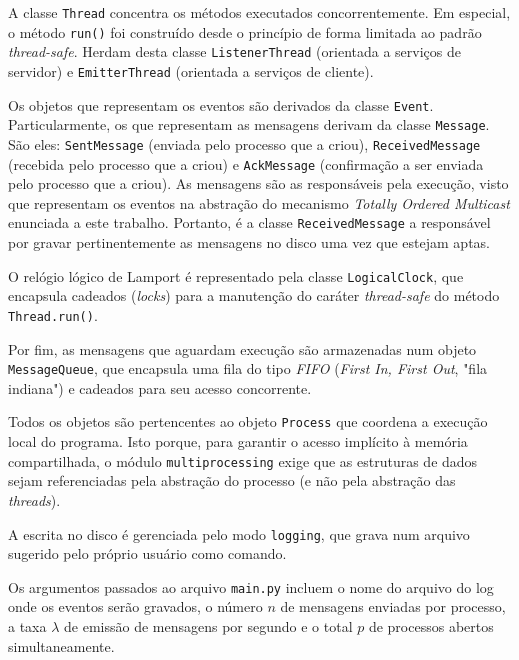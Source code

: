\documentclass[a4paper,12pt]{article}
\begin{document}
        A classe \texttt{Thread} concentra os métodos executados concorrentemente.
        Em especial, o método \texttt{run()} foi construído desde o princípio de forma limitada ao padrão \emph{thread-safe}.
        Herdam desta classe \texttt{ListenerThread} (orientada a serviços de servidor) e \texttt{EmitterThread} (orientada a serviços de cliente).

        Os objetos que representam os eventos são derivados da classe \texttt{Event}.
        Particularmente, os que representam as mensagens derivam da classe \texttt{Message}.
        São eles: \texttt{SentMessage} (enviada pelo processo que a criou), \texttt{ReceivedMessage} (recebida pelo processo que a criou) e \texttt{AckMessage} (confirmação a ser enviada pelo processo que a criou).
        As mensagens são as responsáveis pela execução, visto que representam os eventos na abstração do mecanismo \emph{Totally Ordered Multicast} enunciada a este trabalho.
        Portanto, é a classe \texttt{ReceivedMessage} a responsável por gravar pertinentemente as mensagens no disco uma vez que estejam aptas.

        O relógio lógico de Lamport é representado pela classe \texttt{LogicalClock}, que encapsula cadeados (\emph{locks}) para a manutenção do caráter \emph{thread-safe} do método \texttt{Thread.run()}.

        Por fim, as mensagens que aguardam execução são armazenadas num objeto \texttt{MessageQueue}, que encapsula uma fila do tipo \emph{FIFO} (\emph{First In, First Out}, "fila indiana") e cadeados para seu acesso concorrente.

        Todos os objetos são pertencentes ao objeto \texttt{Process} que coordena a execução local do programa.
        Isto porque, para garantir o acesso implícito à memória compartilhada, o módulo \texttt{multiprocessing} exige que as estruturas de dados sejam referenciadas pela abstração do processo (e não pela abstração das \emph{threads}).

        A escrita no disco é gerenciada pelo modo \texttt{logging}, que grava num arquivo sugerido pelo próprio usuário como comando.

        Os argumentos passados ao arquivo \texttt{main.py} incluem o nome do arquivo do log onde os eventos serão gravados, o número $n$ de mensagens enviadas por processo, a taxa $\lambda$ de emissão de mensagens por segundo e o total $p$ de processos abertos simultaneamente.

            
        
\end{document}
